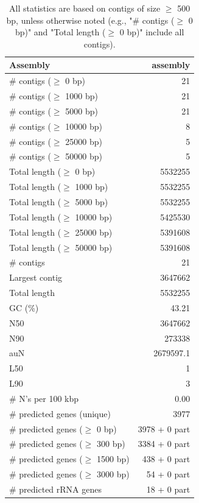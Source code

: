 \documentclass[12pt,a4paper]{article}
\begin{document}
\begin{table}[ht]
\begin{center}
\caption{All statistics are based on contigs of size $\geq$ 500 bp, unless otherwise noted (e.g., "\# contigs ($\geq$ 0 bp)" and "Total length ($\geq$ 0 bp)" include all contigs).}
\begin{tabular}{|l*{1}{|r}|}
\hline
Assembly & assembly \\ \hline
\# contigs ($\geq$ 0 bp) & 21 \\ \hline
\# contigs ($\geq$ 1000 bp) & 21 \\ \hline
\# contigs ($\geq$ 5000 bp) & 21 \\ \hline
\# contigs ($\geq$ 10000 bp) & 8 \\ \hline
\# contigs ($\geq$ 25000 bp) & 5 \\ \hline
\# contigs ($\geq$ 50000 bp) & 5 \\ \hline
Total length ($\geq$ 0 bp) & 5532255 \\ \hline
Total length ($\geq$ 1000 bp) & 5532255 \\ \hline
Total length ($\geq$ 5000 bp) & 5532255 \\ \hline
Total length ($\geq$ 10000 bp) & 5425530 \\ \hline
Total length ($\geq$ 25000 bp) & 5391608 \\ \hline
Total length ($\geq$ 50000 bp) & 5391608 \\ \hline
\# contigs & 21 \\ \hline
Largest contig & 3647662 \\ \hline
Total length & 5532255 \\ \hline
GC (\%) & 43.21 \\ \hline
N50 & 3647662 \\ \hline
N90 & 273338 \\ \hline
auN & 2679597.1 \\ \hline
L50 & 1 \\ \hline
L90 & 3 \\ \hline
\# N's per 100 kbp & 0.00 \\ \hline
\# predicted genes (unique) & 3977 \\ \hline
\# predicted genes ($\geq$ 0 bp) & 3978 + 0 part \\ \hline
\# predicted genes ($\geq$ 300 bp) & 3384 + 0 part \\ \hline
\# predicted genes ($\geq$ 1500 bp) & 438 + 0 part \\ \hline
\# predicted genes ($\geq$ 3000 bp) & 54 + 0 part \\ \hline
\# predicted rRNA genes & 18 + 0 part \\ \hline
\end{tabular}
\end{center}
\end{table}
\end{document}
